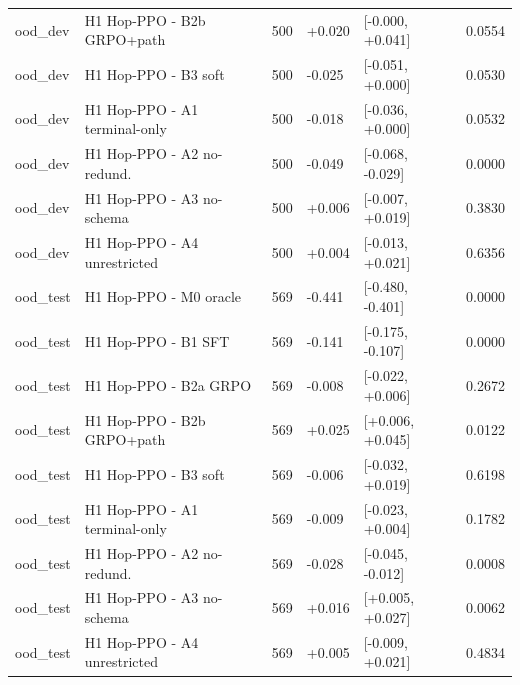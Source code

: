 \begin{tabular}{llllll}
ood\_dev & H1 Hop-PPO - B2b GRPO+path & 500 & +0.020 & [-0.000, +0.041] & 0.0554 \\
ood\_dev & H1 Hop-PPO - B3 soft & 500 & -0.025 & [-0.051, +0.000] & 0.0530 \\
ood\_dev & H1 Hop-PPO - A1 terminal-only & 500 & -0.018 & [-0.036, +0.000] & 0.0532 \\
ood\_dev & H1 Hop-PPO - A2 no-redund. & 500 & -0.049 & [-0.068, -0.029] & 0.0000 \\
ood\_dev & H1 Hop-PPO - A3 no-schema & 500 & +0.006 & [-0.007, +0.019] & 0.3830 \\
ood\_dev & H1 Hop-PPO - A4 unrestricted & 500 & +0.004 & [-0.013, +0.021] & 0.6356 \\
ood\_test & H1 Hop-PPO - M0 oracle & 569 & -0.441 & [-0.480, -0.401] & 0.0000 \\
ood\_test & H1 Hop-PPO - B1 SFT & 569 & -0.141 & [-0.175, -0.107] & 0.0000 \\
ood\_test & H1 Hop-PPO - B2a GRPO & 569 & -0.008 & [-0.022, +0.006] & 0.2672 \\
ood\_test & H1 Hop-PPO - B2b GRPO+path & 569 & +0.025 & [+0.006, +0.045] & 0.0122 \\
ood\_test & H1 Hop-PPO - B3 soft & 569 & -0.006 & [-0.032, +0.019] & 0.6198 \\
ood\_test & H1 Hop-PPO - A1 terminal-only & 569 & -0.009 & [-0.023, +0.004] & 0.1782 \\
ood\_test & H1 Hop-PPO - A2 no-redund. & 569 & -0.028 & [-0.045, -0.012] & 0.0008 \\
ood\_test & H1 Hop-PPO - A3 no-schema & 569 & +0.016 & [+0.005, +0.027] & 0.0062 \\
ood\_test & H1 Hop-PPO - A4 unrestricted & 569 & +0.005 & [-0.009, +0.021] & 0.4834 \\
\bottomrule
\end{tabular}
